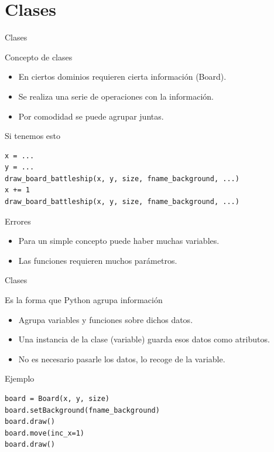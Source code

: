 \documentclass[bigger,unknownkeysallowed]{beamer}
\begin{document}
\section{Clases}
\label{sec:orge4c374b}

\begin{frame}[fragile,label={sec:orge0b9449}]{Clases}
 \begin{block}{Concepto de clases}
\begin{itemize}
\item En ciertos dominios requieren cierta información (Board).

\item Se realiza una serie de operaciones con la información.

\item Por comodidad se puede agrupar juntas.
\end{itemize}
\end{block}

\begin{exampleblock}{Si tenemos esto}
\begin{verbatim}
x = ...
y = ...
draw_board_battleship(x, y, size, fname_background, ...)
x += 1
draw_board_battleship(x, y, size, fname_background, ...)
\end{verbatim}
\end{exampleblock}

\begin{alertblock}{Errores}
\begin{itemize}
\item Para un simple concepto puede haber muchas variables.

\item Las funciones requieren muchos parámetros.
\end{itemize}
\end{alertblock}
\end{frame}

\begin{frame}[fragile,label={sec:org4e59c7f}]{Clases}
 \begin{block}{Es la forma que Python agrupa información}
\begin{itemize}
\item Agrupa variables y funciones sobre dichos datos.

\item Una instancia de la clase (variable) guarda esos datos como atributos.

\item No es necesario pasarle los datos, lo recoge de la variable.
\end{itemize}
\end{block}

\begin{exampleblock}{Ejemplo}
\begin{verbatim}
board = Board(x, y, size)
board.setBackground(fname_background)
board.draw()
board.move(inc_x=1)
board.draw()
\end{verbatim}
\end{exampleblock}
\end{frame}
\end{document}
